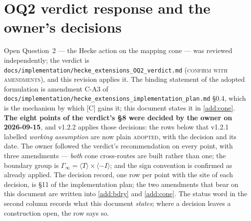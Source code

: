 \documentclass[11pt]{article}
\theoremstyle{remark}
\newcommand{\Ga}{\Gamma}
\begin{document}
\section{OQ2 verdict response and the owner's decisions}\label{app:oq2}
Open Question~2 --- the Hecke action on the mapping cone --- was reviewed independently; the verdict
is \texttt{docs/implementation/\allowbreak hecke\_extensions\_\allowbreak OQ2\_\allowbreak verdict.md}
(\textsc{confirm with amendments}), and this revision applies it. The binding statement of the
adopted formulation is amendment C-A3 of
\texttt{docs/implementation/\allowbreak hecke\_extensions\_\allowbreak implementation\_\allowbreak plan.md}
\S0.4, which is the mechanism by which [C] gains it; this document states it in \ref{add:cone}. \textbf{The
eight points of the verdict's \S8 were decided by the owner on 2026-09-15}, and v1.2.2 applies
those decisions: the rows below that v1.2.1 labelled \emph{working assumption} are now plain
\textsc{adopted}, with the decision and its date. The owner followed the verdict's recommendation on
every point, with three amendments --- \emph{both} cone cross-routes are built rather than one; the
boundary group is $\Ga_\infty=\langle T\rangle\times\langle-I\rangle$; and the sign convention is
confirmed as already applied. The decision record, one row per point with the site of each decision,
is \S11 of the implementation plan; the two amendments that bear on this document are written into
\ref{add:bdry} and \ref{add:cone}. The status word in the second column records what this document
\emph{states}; where a decision leaves a construction open, the row says so.
\end{document}
